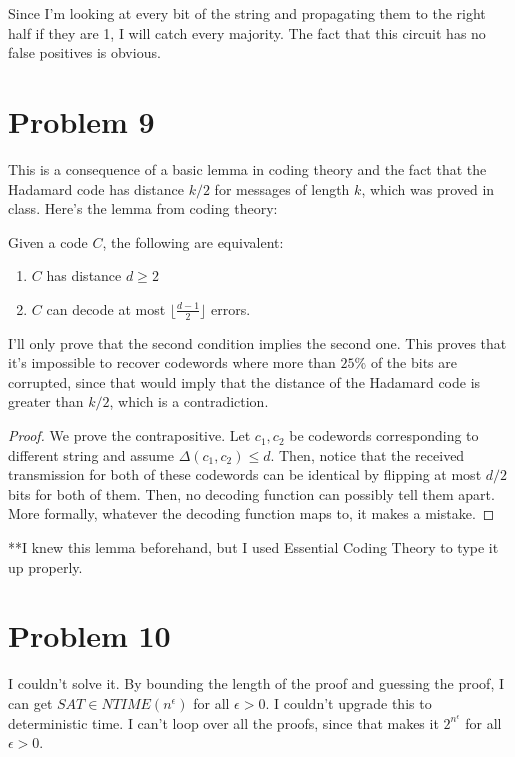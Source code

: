 \documentclass[usletter]{article}
\begin{document}
Since I'm looking at every bit of the string and propagating them to the right half if
they are 1, I will catch every majority. The fact that this circuit has no false positives
is obvious.

\newpage

\section*{Problem 9}

This is a consequence of a basic lemma in coding theory 
and the fact that the Hadamard code has distance $k/2$
for messages of length $k$, which was proved in class. 
Here's the lemma from coding theory:

\begin{lemma}
    Given a code $C$, the following are equivalent:
    \begin{enumerate}
        \item $C$ has distance $d \geq 2$
        \item $C$ can decode at most $\lfloor \frac{d - 1}{2} \rfloor$ errors.
    \end{enumerate}
\end{lemma}

I'll only prove that the second condition implies the second one.
This proves that it's impossible to recover codewords where more than
$25\%$ of the bits are corrupted, since that would imply that the distance
of the Hadamard code is greater than $k/2$, which is a contradiction.

\begin{proof}
    We prove the contrapositive. 
    Let $c_{1},c_{2}$ be codewords corresponding to different string 
    and assume $\Delta(c_{1},c_{2}) \leq d$. Then, notice that the received
    transmission for both of these codewords can be identical by flipping
    at most $d/2$ bits for both of them. Then, no decoding function can possibly tell
    them apart. More formally, whatever the decoding function maps to, it makes
    a mistake.
\end{proof}

**I knew this lemma beforehand, but I used Essential Coding Theory to type it
up properly.

\newpage

\section*{Problem 10}

I couldn't solve it. By bounding the length of the proof
and guessing the proof, I can get $SAT \in NTIME(n^{\epsilon})$
for all $\epsilon > 0$. I couldn't upgrade this to deterministic
time. I can't loop over all the proofs, since that makes it 
$2^{n^{\epsilon}}$ for all $\epsilon > 0$.
\end{document}
